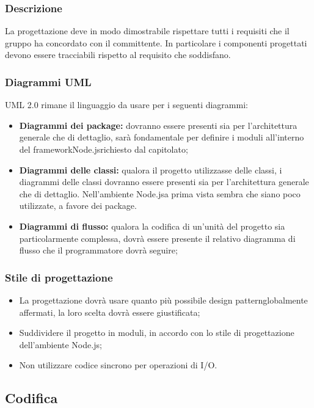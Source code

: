 \documentclass[a4paper,11pt]{article}
\begin{document}
			\subsubsection{Descrizione}
			La progettazione deve in modo dimostrabile rispettare tutti i requisiti che il gruppo ha concordato con il committente. In particolare i componenti progettati devono essere tracciabili rispetto al requisito che soddisfano.
			\subsubsection{Diagrammi UML}
			UML 2.0 rimane il linguaggio da usare per i seguenti diagrammi:
			\begin{itemize}
			\item\textbf{Diagrammi dei package\addglos:} dovranno essere presenti sia per l'architettura generale che di dettaglio, sarà fondamentale per definire i moduli all'interno del framework\addglos Node.js\addglos richiesto dal capitolato;
			\item\textbf{Diagrammi delle classi:} qualora il progetto utilizzasse delle classi, i diagrammi delle classi dovranno essere presenti sia per l'architettura generale che di dettaglio. Nell'ambiente Node.js\addglos a prima vista sembra che siano poco utilizzate, a favore dei package\addglos.
			\item\textbf{Diagrammi di flusso:} qualora la codifica di un'unità del progetto sia particolarmente complessa, dovrà essere presente il relativo diagramma di flusso che il programmatore dovrà seguire;
			\end{itemize}
			\subsubsection{Stile di progettazione}
				\begin{itemize}
				\item La progettazione dovrà usare quanto più possibile design pattern\addglos globalmente affermati, la loro scelta dovrà essere giustificata;
				\item Suddividere il progetto in moduli, in accordo con lo stile di progettazione dell'ambiente Node.js\addglos;
				\item Non utilizzare codice sincrono per operazioni di I/O\addglos.
				
				\end{itemize}
			
			
		\subsection{Codifica}
\end{document}

